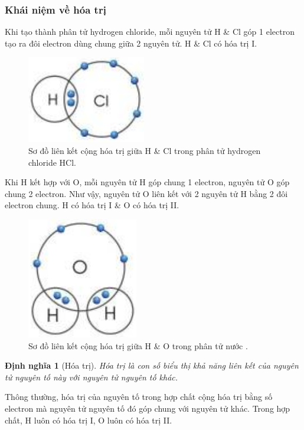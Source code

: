 \documentclass{article}
\newtheorem{dinhnghia}{Định nghĩa}
\begin{document}
\subsubsection{Khái niệm về hóa trị}
Khi tạo thành phân tử hydrogen chloride, mỗi nguyên tử H \& Cl góp 1 electron tạo ra đôi electron dùng chung giữa 2 nguyên tử. H \& Cl có hóa trị I.
\begin{figure}[H]
	\centering
	\includegraphics[scale=0.3]{HCl}
	\caption{Sơ đồ liên kết cộng hóa trị giữa H \& Cl trong phân tử hydrogen chloride HCl.}
\end{figure}
Khi H kết hợp với O, mỗi nguyên tử H góp chung 1 electron, nguyên tử O góp chung 2 electron. Như vậy, nguyên tử O liên kết với 2 nguyên tử H bằng 2 đôi electron chung. H có hóa trị I \& O có hóa trị II.
\begin{figure}[H]
	\centering
	\includegraphics[scale=0.3]{link_H2O}
	\caption{Sơ đồ liên kết cộng hóa trị giữa H \& O trong phân tử nước .}
\end{figure}

\begin{dinhnghia}[Hóa trị]
	\emph{Hóa trị} là con số biểu thị khả năng liên kết của nguyên tử nguyên tố này với nguyên tử nguyên tố khác.
\end{dinhnghia}
Thông thường, hóa trị của nguyên tố trong hợp chất cộng hóa trị bằng số electron mà nguyên tử nguyên tố đó góp chung với nguyên tử khác. Trong hợp chất, H luôn có hóa trị I, O luôn có hóa trị II.
\end{document}
